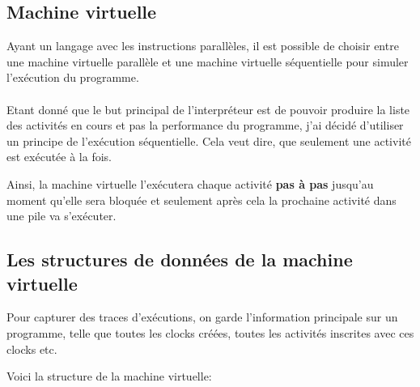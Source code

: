 \documentclass[12pt]{scrartcl}
\begin{document}
\subsection{Machine virtuelle}
Ayant un langage avec les instructions parallèles, il est possible de choisir entre une machine virtuelle parallèle 
et une machine virtuelle séquentielle pour simuler l'exécution du programme. \\\\ Etant donné que le but principal de l'interpréteur est de pouvoir produire la liste des
activités en cours et pas la performance du programme, j'ai décidé d'utiliser un principe de l'exécution séquentielle. 
Cela veut dire, que seulement une activité est exécutée à la fois. 

Ainsi, la machine virtuelle l'exécutera chaque activité \textbf{pas à pas} jusqu'au moment qu'elle sera bloquée et seulement après cela 
la prochaine activité dans une pile va s'exécuter.

\newpage
\subsection{Les structures de données de la machine virtuelle}

Pour capturer des traces d'exécutions, on garde l'information principale sur un programme,
telle que toutes les clocks créées, toutes les activités inscrites avec ces clocks etc.

Voici la structure de la machine virtuelle: \\
\end{document}
